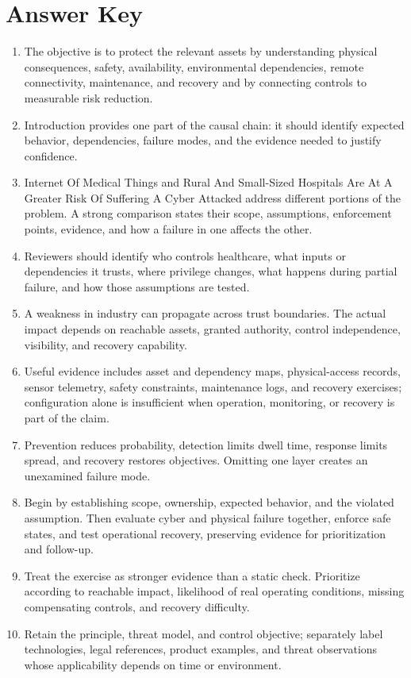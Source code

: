 \documentclass[11pt,letterpaper]{article}
\begin{document}
\section*{Answer Key}
\begin{enumerate}
\item The objective is to protect the relevant assets by understanding physical consequences, safety, availability, environmental dependencies, remote connectivity, maintenance, and recovery and by connecting controls to measurable risk reduction.
\item Introduction provides one part of the causal chain: it should identify expected behavior, dependencies, failure modes, and the evidence needed to justify confidence.
\item Internet Of Medical Things and Rural And Small-Sized Hospitals Are At A Greater Risk Of Suffering A Cyber Attacked address different portions of the problem. A strong comparison states their scope, assumptions, enforcement points, evidence, and how a failure in one affects the other.
\item Reviewers should identify who controls healthcare, what inputs or dependencies it trusts, where privilege changes, what happens during partial failure, and how those assumptions are tested.
\item A weakness in industry can propagate across trust boundaries. The actual impact depends on reachable assets, granted authority, control independence, visibility, and recovery capability.
\item Useful evidence includes asset and dependency maps, physical-access records, sensor telemetry, safety constraints, maintenance logs, and recovery exercises; configuration alone is insufficient when operation, monitoring, or recovery is part of the claim.
\item Prevention reduces probability, detection limits dwell time, response limits spread, and recovery restores objectives. Omitting one layer creates an unexamined failure mode.
\item Begin by establishing scope, ownership, expected behavior, and the violated assumption. Then evaluate cyber and physical failure together, enforce safe states, and test operational recovery, preserving evidence for prioritization and follow-up.
\item Treat the exercise as stronger evidence than a static check. Prioritize according to reachable impact, likelihood of real operating conditions, missing compensating controls, and recovery difficulty.
\item Retain the principle, threat model, and control objective; separately label technologies, legal references, product examples, and threat observations whose applicability depends on time or environment.
\end{enumerate}
\end{document}
